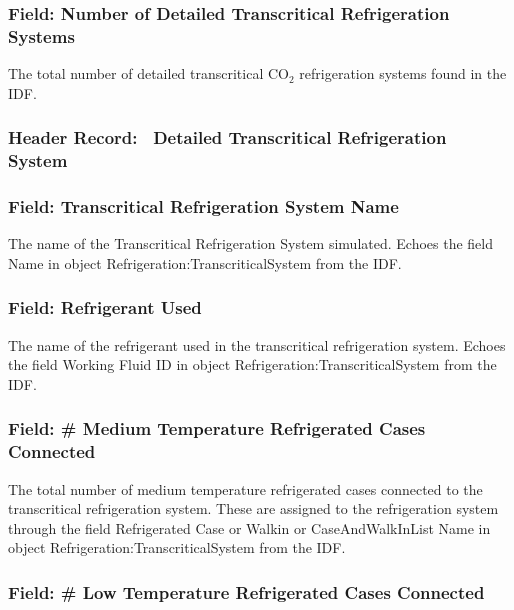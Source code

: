 \subsubsection{Field: Number of Detailed Transcritical Refrigeration Systems}\label{field-number-of-detailed-transcritical-refrigeration-systems}

The total number of detailed transcritical CO\(_{2}\) refrigeration systems found in the IDF.

\subsubsection{Header Record:~ Detailed Transcritical Refrigeration System}\label{header-record-detailed-transcritical-refrigeration-system}

\subsubsection{Field: Transcritical Refrigeration System Name}\label{field-transcritical-refrigeration-system-name}

The name of the Transcritical Refrigeration System simulated. Echoes the field Name in object Refrigeration:TranscriticalSystem from the IDF.

\subsubsection{Field: Refrigerant Used}\label{field-refrigerant-used-1}

The name of the refrigerant used in the transcritical refrigeration system. Echoes the field Working Fluid ID in object Refrigeration:TranscriticalSystem from the IDF.

\subsubsection{Field: \# Medium Temperature Refrigerated Cases Connected}\label{field-medium-temperature-refrigerated-cases-connected}

The total number of medium temperature refrigerated cases connected to the transcritical refrigeration system. These are assigned to the refrigeration system through the field Refrigerated Case or Walkin or CaseAndWalkInList Name in object Refrigeration:TranscriticalSystem from the IDF.

\subsubsection{Field: \# Low Temperature Refrigerated Cases Connected}\label{field-low-temperature-refrigerated-cases-connected}

